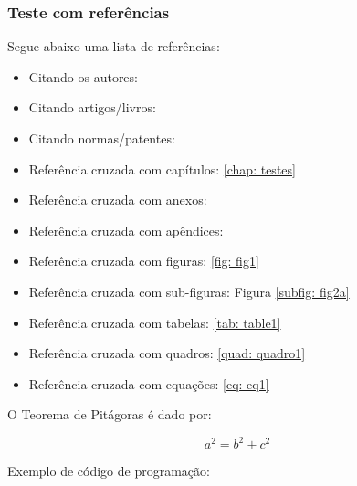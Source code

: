 \subsubsection{Teste com referências}

Segue abaixo uma lista de referências:

\begin{itemize}%
  \item Citando os autores: 
  \item Citando artigos/livros: \cite{Ciresan2012,SMIRNOV201489}
  \item Citando normas/patentes: \cite{NBR6023:2000,EHLINGER:2006:biblatex}
  \item Referência cruzada com capítulos: \autoref{chap: testes}
  \item Referência cruzada com anexos: 
  \item Referência cruzada com apêndices: 
  \item Referência cruzada com figuras: \autoref{fig: fig1}
  \item Referência cruzada com sub-figuras: Figura \ref{subfig: fig2a}
  \item Referência cruzada com tabelas: \autoref{tab: table1}
  \item Referência cruzada com quadros: \autoref{quad: quadro1}
  \item Referência cruzada com equações: \autoref{eq: eq1}
\end{itemize}
    

O Teorema de Pitágoras é dado por:

\begin{equation}
    \label{eq: eq1}
	a^{2}= b^{2}+c^{2}
\end{equation}

Exemplo de código de programação:
  
